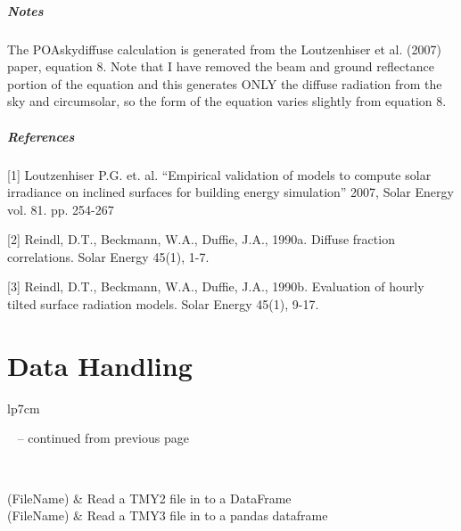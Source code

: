 \documentclass[letterpaper,10pt,english]{sphinxmanual}
\begin{document}
\begin{fulllineitems}
\paragraph{Notes}

The POAskydiffuse calculation is generated from the Loutzenhiser et al.
(2007) paper, equation 8. Note that I have removed the beam and ground
reflectance portion of the equation and this generates ONLY the diffuse
radiation from the sky and circumsolar, so the form of the equation
varies slightly from equation 8.
\paragraph{References}

{[}1{]} Loutzenhiser P.G. et. al. ``Empirical validation of models to compute
solar irradiance on inclined surfaces for building energy simulation''
2007, Solar Energy vol. 81. pp. 254-267

{[}2{]} Reindl, D.T., Beckmann, W.A., Duffie, J.A., 1990a. Diffuse fraction
correlations. Solar Energy 45(1), 1-7.

{[}3{]} Reindl, D.T., Beckmann, W.A., Duffie, J.A., 1990b. Evaluation of hourly
tilted surface radiation models. Solar Energy 45(1), 9-17.

\end{fulllineitems}



\chapter{Data Handling}
\label{index:data-handling}
\begin{longtable}{lp{7cm}}
\hline
\endfirsthead

%
{{\textsf{\tablename\ \thetable{} -- continued from previous page}}} \\
\hline
\endhead

\hline {} \\ \hline
\endfoot

\endlastfoot


{\hyperref[stubs/pvlib.pvl_readtmy2:pvlib.pvl_readtmy2]{}}(FileName)
 & 
Read a TMY2 file in to a DataFrame
\\

{\hyperref[stubs/pvlib.pvl_readtmy3:pvlib.pvl_readtmy3]{}}(FileName)
 & 
Read a TMY3 file in to a pandas dataframe
\\
\hline\end{longtable}
\end{document}
